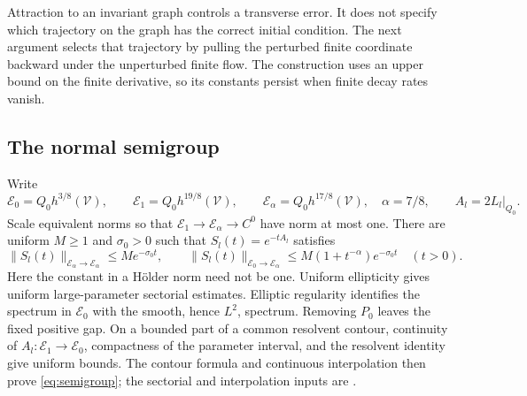\documentclass[11pt]{amsart}
\theoremstyle{definition}
\theoremstyle{remark}
\begin{document}
Attraction to an invariant graph controls a transverse error. It does
not specify which trajectory on the graph has the correct initial
condition. The next argument selects that trajectory by pulling the
perturbed finite coordinate backward under the unperturbed finite flow.
The construction uses an upper bound on the finite derivative, so
its constants persist when finite decay rates vanish.

\subsection{The normal semigroup}
Write
\begin{equation}\label{eq:normal-spaces}
 \mathcal E_0=Q_0h^{3/8}(\mathcal V),\qquad
 \mathcal E_1=Q_0h^{19/8}(\mathcal V),\qquad
 \mathcal E_\alpha=Q_0h^{17/8}(\mathcal V),\quad \alpha=7/8,
 \qquad A_l=2L_l|_{Q_0}.
\end{equation}
Scale equivalent norms so that $\mathcal E_1\to\mathcal E_\alpha
\to C^0$ have norm at most one. There are uniform $M\ge1$ and
$\sigma_0>0$ such that $S_l(t)=e^{-tA_l}$ satisfies
\begin{equation}\label{eq:semigroup}
 \|S_l(t)\|_{\mathcal E_\alpha\to\mathcal E_\alpha}
       \le Me^{-\sigma_0t},\qquad
 \|S_l(t)\|_{\mathcal E_0\to\mathcal E_\alpha}
       \le M(1+t^{-\alpha})e^{-\sigma_0t}\quad(t>0).
\end{equation}
Here the constant in a H\"older norm need not be one. Uniform
ellipticity gives uniform large-parameter sectorial estimates.
Elliptic regularity identifies the spectrum in $\mathcal E_0$
with the smooth, hence $L^2$, spectrum. Removing $P_0$ leaves
the fixed positive gap. On a bounded part of a common resolvent
contour, continuity of $A_l:\mathcal E_1\to\mathcal E_0$,
compactness of the parameter interval, and the resolvent identity
give uniform bounds. The contour formula and continuous interpolation
then prove \eqref{eq:semigroup}; the sectorial and interpolation
inputs are \cite[Proposition 2.2(c), Theorems 3.2 and 3.4--3.6]
{ShaoSimonett14}.
\end{document}
